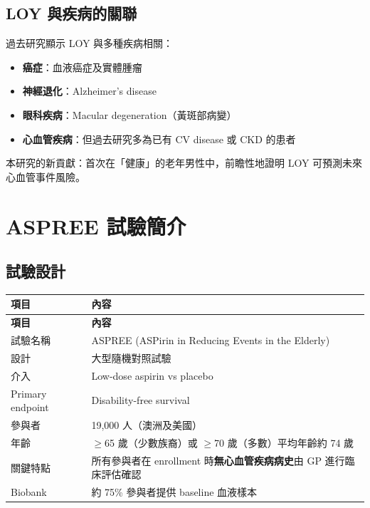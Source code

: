 \documentclass[12pt,a4paper]{article}
\newcommand{\note}[1]{
    \par
    \noindent
    \begin{tcolorbox}[
        colback=emergency_blue!5!white,
        colframe=emergency_blue,
        title=\textbf{重點提醒},
        fonttitle=\bfseries,
        boxrule=0.5pt,
        arc=3pt,
        left=6pt,
        right=6pt,
        top=6pt,
        bottom=6pt
    ]
    #1
    \end{tcolorbox}
}
\begin{document}
\subsection{LOY 與疾病的關聯}

過去研究顯示 LOY 與多種疾病相關：
\begin{itemize}
    \item \textbf{癌症}：血液癌症及實體腫瘤
    \item \textbf{神經退化}：Alzheimer's disease
    \item \textbf{眼科疾病}：Macular degeneration（黃斑部病變）
    \item \textbf{心血管疾病}：但過去研究多為已有 CV disease 或 CKD 的患者
\end{itemize}

\note{
本研究的新貢獻：首次在「健康」的老年男性中，前瞻性地證明 LOY 可預測未來心血管事件風險。
}

\section{ASPREE 試驗簡介}

\subsection{試驗設計}

\begin{longtable}{p{4cm}p{10cm}}
\toprule
\textbf{項目} & \textbf{內容} \\
\midrule
\endfirsthead
\toprule
\textbf{項目} & \textbf{內容} \\
\midrule
\endhead
試驗名稱 & ASPREE (ASPirin in Reducing Events in the Elderly) \\
\midrule
設計 & 大型隨機對照試驗 \\
\midrule
介入 & Low-dose aspirin vs placebo \\
\midrule
Primary endpoint & Disability-free survival \\
\midrule
參與者 & 19,000 人（澳洲及美國） \\
\midrule
年齡 & $\geq$65 歲（少數族裔）或 $\geq$70 歲（多數）\newline 平均年齡約 74 歲 \\
\midrule
關鍵特點 & 所有參與者在 enrollment 時\textbf{無心血管疾病病史}\newline 由 GP 進行臨床評估確認 \\
\midrule
Biobank & 約 75\% 參與者提供 baseline 血液樣本 \\
\bottomrule
\end{longtable}
\end{document}

